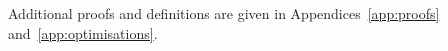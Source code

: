 \documentclass[acmsmall,review,anonymous]{acmart}
\begin{document}
\noindent Additional proofs and definitions are given in Appendices~\ref{app:proofs}
and~\ref{app:optimisations}.

%
%






\end{document}
